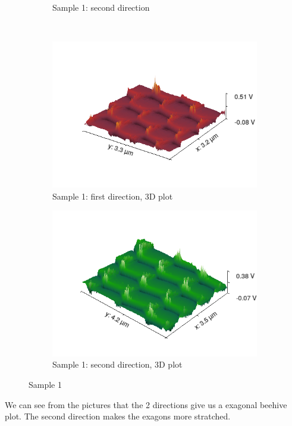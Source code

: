\documentclass[11pt,a4paper]{article}
\begin{document}
\begin{figure}[H]
\begin{subfigure}[b]{0.45\textwidth}
\caption{Sample 1: second direction}
\label{fig:}
\end{subfigure}\\\vspace{.2cm}
\begin{subfigure}[b]{0.45\textwidth}
\includegraphics[width=\textwidth]{sm_sample1_3D}
\caption{Sample 1: first direction, 3D plot}
\label{fig:}
\end{subfigure}
\begin{subfigure}[b]{0.45\textwidth}
\includegraphics[width=\textwidth]{sm_sample1_dir2_3D}
\caption{Sample 1: second direction, 3D plot}
\label{fig:}
\end{subfigure}
\caption{Sample 1}
\end{figure}
We can see from the pictures that the 2 directions give us a exagonal beehive plot. The second direction makes the exagons more stratched.%
\end{document}
